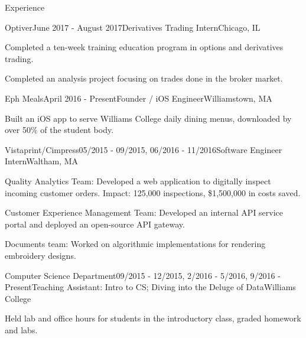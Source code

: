 \documentclass{resume} %
\begin{document}
\begin{rSection}{Experience}

\begin{rSubsection}{Optiver}{June 2017 - August 2017}{Derivatives Trading Intern}{Chicago, IL}
  \item Completed a ten-week training education program in options and derivatives trading.
  \item Completed an analysis project focusing on trades done in the broker market.
\end{rSubsection}



\begin{rSubsection}{Eph Meals}{April 2016 - Present}{Founder / iOS Engineer}{Williamstown, MA}
  \item Built an iOS app to serve Williams College daily dining menus, downloaded by over 50\% of the student body.
\end{rSubsection}


\begin{rSubsection}{Vistaprint/Cimpress}{05/2015 - 09/2015, 06/2016 - 11/2016}{Software Engineer Intern}{Waltham, MA}
  \item Quality Analytics Team: Developed a web application to digitally inspect incoming customer orders. Impact: 125,000 inspections, \$1,500,000 in costs saved.
  \item Customer Experience Management Team: Developed an internal API service portal and deployed an open-source API gateway.
  \item Documents team: Worked on algorithmic implementations for rendering embroidery designs.
\end{rSubsection}

\begin{rSubsection}{Computer Science Department}{09/2015 - 12/2015, 2/2016 - 5/2016, 9/2016 - Present}{Teaching Assistant: Intro to CS; Diving into the Deluge of Data}{Williams College}
  \item Held lab and office hours for students in the introductory class, graded homework and labs.
\end{rSubsection}
\end{rSection}
\end{document}
